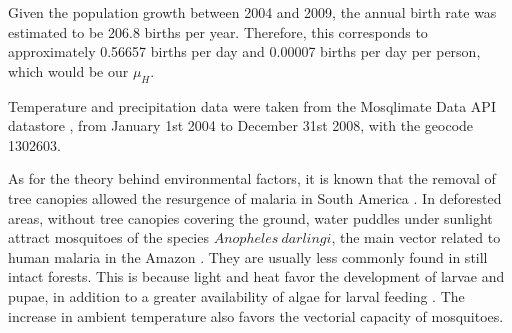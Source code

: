 \documentclass[a4paper,fleqn]{cas-dc}
\begin{document}



Given the population growth between 2004 and 2009, the annual birth rate was 
estimated to be 206.8 births per year. Therefore, this corresponds 
to approximately 0.56657 births per day and 0.00007 births per day 
per person, which would be our $\mu_H$. 

Temperature and precipitation data were taken from the Mosqlimate Data API datastore \cite{MosqlimateAPI}, from January 1st 2004 to December 31st 2008, with the geocode 1302603.

As for the theory behind environmental factors, it is known that the removal of tree canopies allowed 
the resurgence of malaria in South America \cite{Norris2004}. In deforested areas, 
without tree canopies covering the ground, water puddles under sunlight 
attract mosquitoes of the species $Anopheles \ darlingi$, the main vector 
related to human malaria in the Amazon \cite{infoAnopheles}. They are 
usually less commonly found in still intact forests. This is 
because light and heat favor the development of larvae and 
pupae, in addition to a greater availability of algae for 
larval feeding \cite{article_alteracoesambientais}. The increase 
in ambient temperature also favors the vectorial capacity of 
mosquitoes. 
\end{document}
